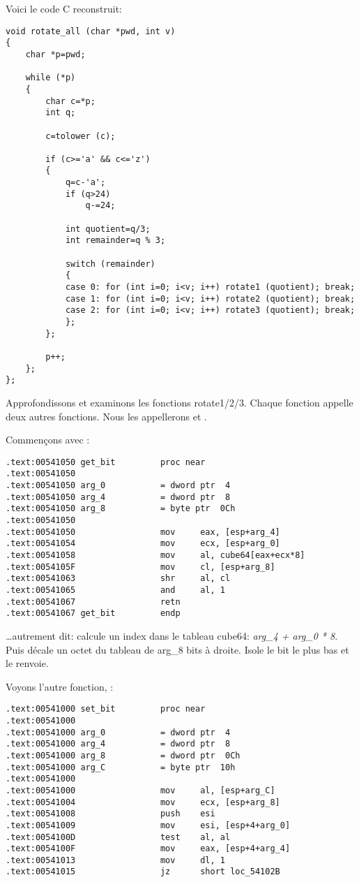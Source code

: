 Voici le code C reconstruit:

\begin{lstlisting}[style=customc]
void rotate_all (char *pwd, int v)
{
	char *p=pwd;

	while (*p)
	{
		char c=*p;
		int q;

		c=tolower (c);

		if (c>='a' && c<='z')
		{
			q=c-'a';
			if (q>24)
				q-=24;

			int quotient=q/3;
			int remainder=q % 3;

			switch (remainder)
			{
			case 0: for (int i=0; i<v; i++) rotate1 (quotient); break;
			case 1: for (int i=0; i<v; i++) rotate2 (quotient); break;
			case 2: for (int i=0; i<v; i++) rotate3 (quotient); break;
			};
		};

		p++;
	};
};
\end{lstlisting}

Approfondissons et examinons les fonctions rotate1/2/3.
Chaque fonction appelle deux autres fonctions.
Nous les appellerons  et .

Commençons avec :

\begin{lstlisting}[style=customasmx86]
.text:00541050 get_bit         proc near
.text:00541050
.text:00541050 arg_0           = dword ptr  4
.text:00541050 arg_4           = dword ptr  8
.text:00541050 arg_8           = byte ptr  0Ch
.text:00541050
.text:00541050                 mov     eax, [esp+arg_4]
.text:00541054                 mov     ecx, [esp+arg_0]
.text:00541058                 mov     al, cube64[eax+ecx*8]
.text:0054105F                 mov     cl, [esp+arg_8]
.text:00541063                 shr     al, cl
.text:00541065                 and     al, 1
.text:00541067                 retn
.text:00541067 get_bit         endp
\end{lstlisting}

\dots autrement dit: calcule un index dans le tableau cube64: \emph{arg\_4 + arg\_0 * 8}.
Puis décale un octet du tableau de arg\_8 bits à droite.
Isole le bit le plus bas et le renvoie.

Voyons l'autre fonction, :

\begin{lstlisting}[style=customasmx86]
.text:00541000 set_bit         proc near
.text:00541000
.text:00541000 arg_0           = dword ptr  4
.text:00541000 arg_4           = dword ptr  8
.text:00541000 arg_8           = dword ptr  0Ch
.text:00541000 arg_C           = byte ptr  10h
.text:00541000
.text:00541000                 mov     al, [esp+arg_C]
.text:00541004                 mov     ecx, [esp+arg_8]
.text:00541008                 push    esi
.text:00541009                 mov     esi, [esp+4+arg_0]
.text:0054100D                 test    al, al
.text:0054100F                 mov     eax, [esp+4+arg_4]
.text:00541013                 mov     dl, 1
.text:00541015                 jz      short loc_54102B
\end{lstlisting}

